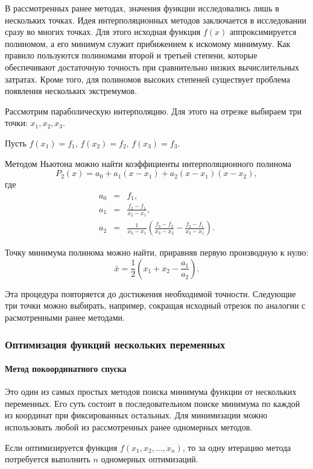 В рассмотренных ранее методах, значения функции исследовались лишь
в нескольких точках. Идея интерполяционных методов заключается в исследовании
сразу во многих точках. Для этого исходная функция $f(x)$ аппроксимируется
полиномом, а его минимум служит прибижением к искомому минимуму. Как
правило пользуются полиномами второй и третьей степени, которые обеспечивают
достаточную точность при сравнительно низких вычислительных затратах.
Кроме того, для полиномов высоких степеней существует проблема появления
нескольких экстремумов.

Рассмотрим параболическую интерполяцию. Для этого на отрезке выбираем
три точки: $x_{1},x_{2},x_{3}.$

Пусть $f(x_{1})=f_{1}$, $f(x_{2})=f_{2}$, $f(x_{3})=f_{3}$.

Методом Ньютона можно найти коэффициенты интерполяционного полинома
\[
P_{2}(x)=a_{0}+a_{1}(x-x_{1})+a_{2}(x-x_{1})(x-x_{2}),
\]
где
\begin{eqnarray*}
a_{0} & = & f_{1},\\
a_{1} & = & \frac{f_{2}-f_{1}}{x_{2}-x_{1}},\\
a_{2} & = & \frac{1}{x_{3}-x_{1}}\left(\frac{f_{3}-f_{2}}{x_{3}-x_{2}}-\frac{f_{2}-f_{1}}{x_{2}-x_{1}}\right).
\end{eqnarray*}


Точку минимума полинома можно найти, приравняв первую производную
к нулю:
\[
\bar{x}=\frac{1}{2}(x_{1}+x_{2}-\frac{a_{1}}{a_{2}}).
\]


Эта процедура повторяется до достижения необходимой точности. Следующие
три точки можно выбирать, например, сокращая исходный отрезок по аналогии
с расмотренными ранее методами.


\subsubsection{Оптимизация функций нескольких переменных}


\paragraph{Метод покоординатного спуска}

Это один из самых простых методов поиска минимума функции от нескольких
переменных. Его суть состоит в последовательном поиске минимума по
каждой из координат при фиксированных остальных. Для минимизации можно
использовать любой из рассмотренных ранее одномерных методов.

Если оптимизируется функция $f(x_{1},x_{2},\dots,x_{n})$, то за одну
итерацию метода потребуется выполнить $n$ одномерных оптимизаций.

